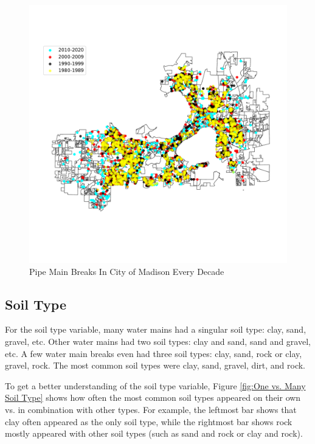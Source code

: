 \documentclass[twocolumn]{article}
\begin{document}
\begin{figure}
    \includegraphics[scale=0.728]{Gautam/decade_plot.pdf}
    \caption{Pipe Main Breaks In City of Madison Every Decade}
    \label{fig:Location}
\end{figure}


\subsection{Soil Type}

For the soil type variable, many water mains had a singular soil type: clay, sand, gravel, etc. Other water mains had two soil types: clay and sand, sand and gravel, etc. A few water main breaks even had three soil types: clay, sand, rock or clay, gravel, rock. The most common soil types were clay, sand, gravel, dirt, and rock. 

To get a better understanding of the soil type variable, Figure \ref{fig:One vs. Many Soil Type} shows how often the most common soil types appeared on their own vs. in combination with other types. For example, the leftmost bar shows that clay often appeared as the only soil type, while the rightmost bar shows rock mostly appeared with other soil types (such as sand and rock or clay and rock).
\end{document}
